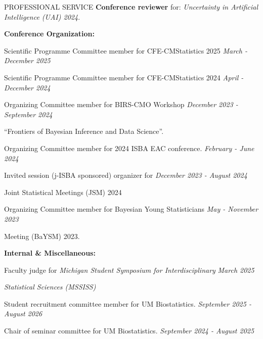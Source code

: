 \documentclass{resume} %
\newcommand{\thisYear}[1]{
	#1
}
\begin{document}
\begin{rSection}{PROFESSIONAL SERVICE}
 \smallskip 
%    
    \textbf{Conference reviewer} for: \emph{Uncertainty in Artificial Intelligence (UAI) 2024}. 
    
    \medskip 

 \hspace*{-0.2in}\textbf{Conference Organization:}
 
 \thisYear{
 	Scientific Programme Committee member for CFE-CMStatistics 2025 \hfill {\em March - December 2025}
 }
 
 \smallskip 
 
 	\thisYear{
 Scientific Programme Committee member for CFE-CMStatistics 2024 \hfill {\em April - December 2024}
}
 
 
 \smallskip 
 
 	\thisYear{
 Organizing Committee member for BIRS-CMO Workshop	\hfill {\em December 2023 - September 2024}
 }
\vspace{-0.1in}
	\thisYear{
``Frontiers of Bayesian Inference and Data Science''. 
}

 
\smallskip 
 
	\thisYear{
Organizing Committee member for 2024 ISBA EAC conference. 	\hfill {\em February - June 2024}
}
	
\smallskip

	\thisYear{
Invited session (j-ISBA sponsored) organizer for  \hfill  {\em December 2023 - August 2024}
}

\vspace{-0.1in}
Joint Statistical Meetings (JSM) 2024


\smallskip
	
Organizing Committee member for Bayesian Young Statisticians  \hfill {\em May - November 2023}

\vspace{-0.1in}
Meeting (BaYSM) 2023.

\medskip 

 \hspace*{-0.2in}\textbf{Internal \& Miscellaneous: }
 
 Faculty judge for \emph{Michigan Student Symposium for Interdisciplinary}  \hfill {\em March 2025}


 \vspace*{-0.1in}
 \emph{Statistical Sciences (MSSISS)}
 
 Student recruitment committee member for UM Biostatistics. \hfill {\em September 2025 - August 2026}

 
 Chair of seminar committee for UM Biostatistics. \hfill {\em September 2024 - August 2025}


\end{rSection}
\end{document}

